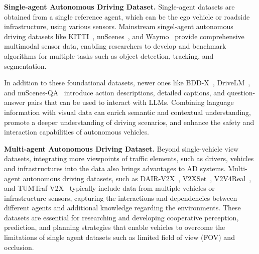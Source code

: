\textbf{Single-agent Autonomous Driving Dataset.} Single-agent datasets are obtained from a single reference agent, which can be the ego vehicle or roadside infrastructure, using various sensors.
Mainstream singel-agent autonomous driving datasets like KITTI~\cite{geiger2012we}, nuScenes~\cite{caesar2020nuscenes}, and Waymo~\cite{sun2020scalability} provide comprehensive multimodal sensor data, enabling researchers to develop and benchmark algorithms for multiple tasks such as object detection, tracking, and segmentation.

In addition to these foundational datasets, newer ones like BDD-X~\cite{kim2018textual}, DriveLM~\cite{sima2025drivelm}, and nuScenes-QA~\cite{qian2024nuscenes} introduce action descriptions, detailed captions, and question-answer pairs that can be used to interact with LLMs.
Combining language information with visual data can enrich semantic and contextual understanding, promote a deeper understanding of driving scenarios, and enhance the safety and interaction capabilities of autonomous vehicles.

\textbf{Multi-agent Autonomous Driving Dataset.}
Beyond single-vehicle view datasets, integrating more viewpoints of traffic elements, such as drivers, vehicles and infrastructures into the data also brings advantages to AD systems. 
Multi-agent autonomous driving datasets, such as DAIR-V2X~\cite{yu2022dair}, V2XSet~\cite{xu2022v2x}, V2V4Real~\cite{xu2023v2v4real}, and TUMTraf-V2X~\cite{zimmer2024tumtraf}  typically include data from multiple vehicles or infrastructure sensors, capturing the interactions and dependencies between different agents and additional knowledge regarding the environments.
These datasets are essential for researching and developing cooperative perception, prediction, and planning strategies that enable vehicles to overcome the limitations of single agent datasets such as limited field of view (FOV) and occlusion.

